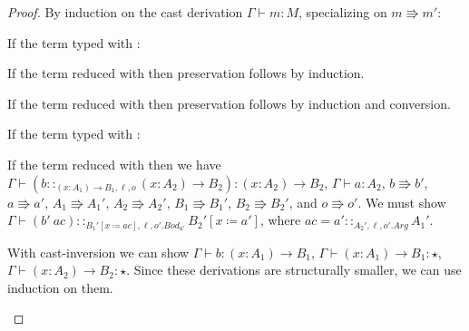 \begin{proof}
By induction on the cast derivation $\Gamma \vdash m:M$, specializing on $m\Rrightarrow m'$:
 
\begin{casenv}
 \item If the term typed with :
 \begin{casenv}
   \item If the term reduced with  then preservation follows by induction.
   \item If the term reduced with  then preservation follows by induction and conversion.
 \end{casenv}
 \item If the term typed with :
 \begin{casenv}
   \item If the term reduced with  then we have
   $\Gamma \vdash\left(b::_{\left(x:A_{1}\right)\rightarrow B_{1},\ell ,o}\left(x:A_{2}\right)\rightarrow B_{2}\right):\left(x:A_{2}\right)\rightarrow B_{2}$,
   $\Gamma \vdash a:A_{2}$,
   $b\Rrightarrow b'$, $a\Rrightarrow a'$, $A_{1}\Rrightarrow A_{1}'$,
   $A_{2}\Rrightarrow A_{2}'$, $B_{1}\Rrightarrow B_{1}'$,  $B_{2}\Rrightarrow B_{2}'$,
   and $o\Rrightarrow o'$.
   We must show $\Gamma \vdash\left(b'\ ac\right)::_{B_{1}'\left[x\coloneqq ac\right],\ell ,o'.Bod_{a'}}B_{2}'\left[x\coloneqq a'\right]$, where $ac=a'::_{A_{2}',\ell,o'.Arg}A_{1}'$.
  
   With cast-inversion we can show $\Gamma \vdash b:\left(x:A_{1}\right)\rightarrow B_{1}$, $\Gamma \vdash\left(x:A_{1}\right)\rightarrow B_{1}:\star$,
   $\Gamma \vdash\left(x:A_{2}\right)\rightarrow B_{2}:\star$.
   Since these derivations are structurally smaller, we can use induction on them.
 

\end{casenv}
\end{casenv}
\end{proof}
